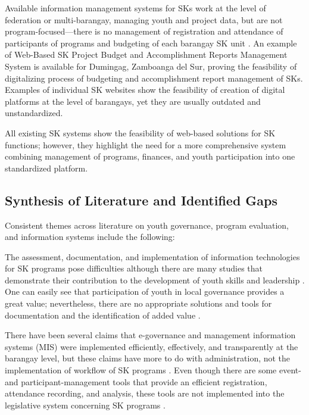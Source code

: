 \hspace*{\parindent}Available information management systems for SKs work at the level of federation or multi-barangay, managing youth and project data, but are not program-focused---there is no management of registration and attendance of participants of programs and budgeting of each barangay SK unit \cite{J,K,AC,E}. An example of Web-Based SK Project Budget and Accomplishment Reports Management System is available for Dumingag, Zamboanga del Sur, proving the feasibility of digitalizing process of budgeting and accomplishment report management of SKs. Examples of individual SK websites show the feasibility of creation of digital platforms at the level of barangays, yet they are usually outdated and unstandardized.
\vspace{5mm}

\hspace*{\parindent}All existing SK systems show the feasibility of web-based solutions for SK functions; however, they highlight the need for a more comprehensive system combining management of programs, finances, and youth participation into one standardized platform.
\vspace{5mm}

\subsection{Synthesis of Literature and Identified Gaps}

\hspace*{\parindent}Consistent themes across literature on youth governance, program evaluation, and information systems include the following:
\vspace{5mm}

\hspace*{\parindent}The assessment, documentation, and implementation of information technologies for SK programs pose difficulties although there are many studies that demonstrate their contribution to the development of youth skills and leadership \cite{G,I,AC,AP}. One can easily see that participation of youth in local governance provides a great value; nevertheless, there are no appropriate solutions and tools for documentation and the identification of added value \cite{Q,S,AK,AN}.
\vspace{5mm}

\hspace*{\parindent}There have been several claims that e-governance and management information systems (MIS) were implemented efficiently, effectively, and transparently at the barangay level, but these claims have more to do with administration, not the implementation of workflow of SK programs \cite{C,D,V,AM}. Even though there are some event- and participant-management tools that provide an efficient registration, attendance recording, and analysis, these tools are not implemented into the legislative system concerning SK programs \cite{A}.
\vspace{5mm}

